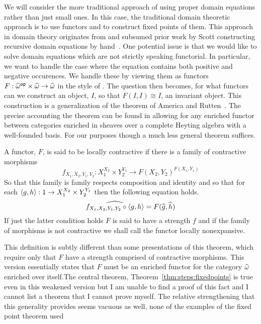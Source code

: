 We will consider the more traditional approach of using proper domain
equations rather than just small ones. In this case, the traditional
domain theoretic approach is to use functors and to construct fixed
points of them. This approach in domain theory originates from
\citet{TODO-PLOTKIN-SMYTH} and subsumed prior work by Scott
constructing recursive domain equations by
hand~\citep{TODO-SCOTT}. One potential issue is that we would like to
solve domain equations which are not strictly speaking functorial. In
particular, we want to handle the case where the equation contains
both positive and negative occurences. We handle these by viewing them
as functors
$F : \widehat{\omega}^{\mathsf{op}} \times \widehat{\omega} \to
\widehat{\omega}$
in the style of \citet{TODO-MIXED-VARIANCE}. The question then
becomes, for what functors can we construct an object, $I$, so that
$F(I, I) \cong I$, an invariant object. This construction is a
generalization of the theorem of America and
Rutten~\citep{TODO-AMERICA}. The precise accounting the theorem can
be found in \citet{Birkedal:11} allowing for any enriched functor
between categories enriched in sheaves over a complete Heyting algebra
with a well-founded basis. For our purposes though a much less general
theorem suffices.
\begin{defn}
  A functor, $F$, is said to be locally contractive if there is a
  family of contractive morphisms
  \[
    f_{X_1, X_2, Y_1, Y_2} :
    X_1^{X_2} \times Y_2^{Y_1} \to F(X_2, Y_2)^{F(X_1, Y_1)}
  \]
  So that this family is family respects composition and identity and
  so that for each $\left\langle g, h \right\rangle : 1 \to X_1^{X_2} \times Y_2^{Y_1}$
  then the following equation holds.
  \[
    \widehat{f_{X_1, X_2, Y_1, Y_2} \circ \left\langle g, h \right\rangle} =
    F(\widehat{g}, \widehat{h})
  \]
  If just the latter condition holds $F$ is said to have a strength
  $f$ and if the family of morphisms is not contractive we shall call
  the functor locally nonexpansive.
\end{defn}
This definition is subtly different than some presentations of this
theorem, which require only that $F$ have a strength comprised of
contractive morphisms. This version essentially states that $F$ must
be an enriched functor for the category $\widehat{\omega}$ enriched
over itself.The central theorem, Theorem~\ref{thm:steps:fixedpoints}
is true even in this weakened version but I am unable to find a proof
of this fact and I cannot list a theorem that I cannot prove
myself. The relative strengthening that this generality provides seems
vacuous as well, none of the examples of the fixed point theorem used
